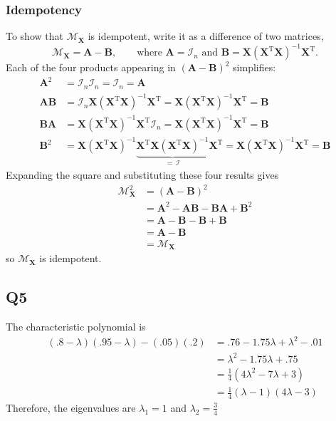 \documentclass{article}
\newcommand{\I}{\mathcal{I}}
\newcommand{\X}{\mathbf{X}}
\newcommand{\tp}{^{\mathrm T}}
\begin{document}
\subsubsection*{Idempotency}

To show that $\mathcal M_{\X}$ is idempotent, write it as a difference of two matrices,
\begin{equation*}
    \mathcal M_{\X}=\mathbf A-\mathbf B,\qquad\text{where }\mathbf A=\I_n\text{ and }\mathbf B=\X(\X\tp\X)^{-1}\X\tp.
\end{equation*}
Each of the four products appearing in $(\mathbf A-\mathbf B)^2$ simplifies:
\begin{align*}
    \mathbf A^2&=\I_n\I_n=\I_n=\mathbf A\\
    \mathbf A\mathbf B&=\I_n\X(\X\tp\X)^{-1}\X\tp=\X(\X\tp\X)^{-1}\X\tp=\mathbf B\\
    \mathbf B\mathbf A&=\X(\X\tp\X)^{-1}\X\tp\I_n=\X(\X\tp\X)^{-1}\X\tp=\mathbf B\\
    \mathbf B^2&=\X(\X\tp\X)^{-1}\underbrace{\X\tp\X(\X\tp\X)^{-1}}_{=\,\I}\X\tp=\X(\X\tp\X)^{-1}\X\tp=\mathbf B
\end{align*}
Expanding the square and substituting these four results gives
\begin{align*}
    \mathcal M_{\X}^2&=(\mathbf A-\mathbf B)^2\\
    &=\mathbf A^2-\mathbf A\mathbf B-\mathbf B\mathbf A+\mathbf B^2\\
    &=\mathbf A-\mathbf B-\mathbf B+\mathbf B\\
    &=\mathbf A-\mathbf B\\
    &=\mathcal M_{\X}
\end{align*}
so $\mathcal M_{\X}$ is idempotent.

\subsection*{Q5}
The characteristic polynomial is 
\begin{align*}
    (.8-\lambda)(.95-\lambda)-(.05)(.2)&=.76-1.75\lambda+\lambda^2-.01\\
    &=\lambda^2-1.75\lambda+.75\\
    &=\frac14(4\lambda^2-7\lambda+3)\\
    &=\frac14(\lambda-1)(4\lambda-3)
\end{align*}
Therefore, the eigenvalues are $\lambda_1=1$ and $\lambda_2=\frac{3}{4}$
\end{document}

